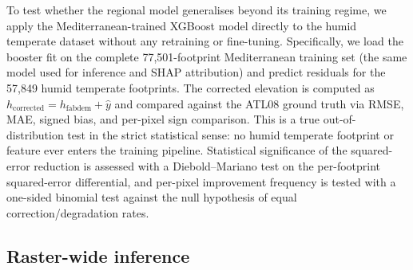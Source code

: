 \documentclass[preprint,authoryear,number]{elsarticle}
\begin{document}
To test whether the regional model generalises beyond its training regime, we apply the Mediterranean-trained XGBoost model directly to the humid temperate dataset without any retraining or fine-tuning. Specifically, we load the booster fit on the complete 77{,}501-footprint Mediterranean training set (the same model used for inference and SHAP attribution) and predict residuals for the 57{,}849 humid temperate footprints. The corrected elevation is computed as $h_{\text{corrected}} = h_{\text{fabdem}} + \hat{y}$ and compared against the ATL08 ground truth via RMSE, MAE, signed bias, and per-pixel sign comparison. This is a true out-of-distribution test in the strict statistical sense: no humid temperate footprint or feature ever enters the training pipeline. Statistical significance of the squared-error reduction is assessed with a Diebold--Mariano test on the per-footprint squared-error differential, and per-pixel improvement frequency is tested with a one-sided binomial test against the null hypothesis of equal correction/degradation rates.

\subsection{Raster-wide inference}
\label{sec:raster_inference}
\end{document}

